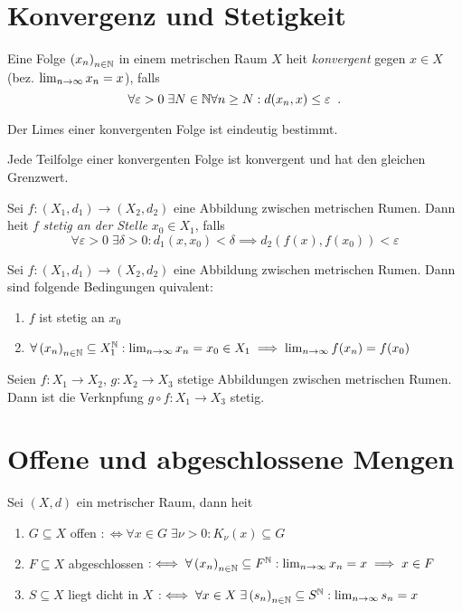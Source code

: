 \section{Konvergenz und Stetigkeit}
\begin{definition}
	Eine Folge \(\left (x_n\right )_{n\in \mathbb{N}}\)  in einem metrischen Raum $X$ hei\s t \textit{konvergent} gegen $x \in X$  (bez. $\lim_{n \to \infty} x_n  = x$), falls 
	\[\forall \varepsilon > 0 \;\exists N \in \mathbb{N} \forall n \geq N: d(x_n, x) \leq \varepsilon \;\;.\]
\end{definition}
\begin{theorem}
	Der Limes einer konvergenten Folge ist eindeutig bestimmt. 
\end{theorem}
\begin{theorem}
	Jede Teilfolge einer konvergenten Folge ist konvergent und hat den gleichen Grenzwert.
\end{theorem}

\begin{definition}
	Sei \(f: (X_1, d_1) \to (X_2, d_2)\) eine Abbildung zwischen metrischen R\as umen. Dann hei\s t $f$ \textit{stetig an der Stelle} $x_0 \in X_1$, falls
	\[\forall \varepsilon > 0\;\exists \delta > 0: d_1(x, x_0) < \delta \implies d_2(f(x), f(x_0)) < \varepsilon\]
\end{definition}

\begin{theorem}
	Sei \(f: (X_1, d_1) \to (X_2, d_2)\) eine Abbildung zwischen metrischen R\as umen. Dann sind folgende Bedingungen \as quivalent:
	\begin{enumerate}[noitemsep]
		\item $f$ ist stetig an $x_0$
		\item $\forall \left (x_n\right )_{n\in \mathbb{N}} \subseteq X_1^{\mathbb{N}} : \lim_{n \to \infty} x_n = x_0 \in X_1 \implies \lim_{n \to \infty} f(x_n) = f(x_0)$ 
	\end{enumerate}
\end{theorem}
\begin{theorem}
	Seien \(f: X_1 \to X_2\), \(g: X_2\to X_3\) stetige Abbildungen zwischen metrischen R\as umen. Dann ist die Verkn\us pfung \(g \circ f: X_1 \to X_3\) stetig. 
\end{theorem}

\section{Offene und abgeschlossene Mengen}
\begin{definition}
	Sei \((X,d)\) ein metrischer Raum, dann hei\s t 
	\begin{enumerate}[noitemsep]
		\item \(G \subseteq X \) offen \(:\iff \forall x \in G\; \exists \nu > 0: K_\nu(x) \subseteq G\)
		\item \(F \subseteq X\) abgeschlossen \(:\iff \forall \left (x_n\right )_{n\in \mathbb{N}} \subseteq F^{\mathbb{N}}: \lim_{n \to \infty} x_n = x \implies x \in F\)
		\item $S \subseteq X$ liegt dicht in $X$ \(:\iff \forall x \in X \;\exists \left (s_n\right )_{n\in \mathbb{N}} \subseteq S^{\mathbb{N}}: \lim_{n \to \infty} s_n = x \)
	\end{enumerate}
\end{definition}

